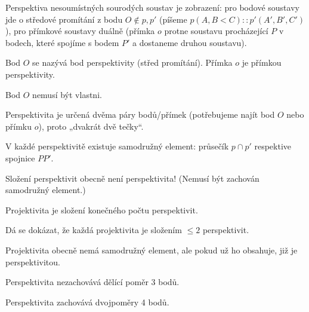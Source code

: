 \documentclass[12pt]{article}					%
\begin{document}
\begin{definice}[Perspektiva]
	Perspektiva nesoumístných sourodých soustav je zobrazení: pro bodové soustavy jde o středové promítání z bodu $O \notin p, p'$ (píšeme $p(A, B< C)::p'(A', B', C')$), pro přímkové soustavy duálně (přímka $o$ protne soustavu procházející $P$ v bodech, které spojíme s bodem $P'$ a dostaneme druhou soustavu).

	Bod $O$ se nazývá bod perspektivity (střed promítání). Přímka $o$ je přímkou perspektivity.

	\begin{poznamkain}
		Bod $O$ nemusí být vlastni.
	\end{poznamkain}

	\begin{poznamkain}[Značení $::$]
		Perspektivita je určená dvěma páry bodů/přímek (potřebujeme najít bod $O$ nebo přímku $o$), proto „dvakrát dvě tečky“.
	\end{poznamkain}
\end{definice}

\begin{dusledek}
	V každé perspektivitě existuje samodružný element: průsečík $p \cap p'$ respektive spojnice $P P'$.
\end{dusledek}

\begin{upozorneni}
	Složení perspektivit obecně není perspektivita! (Nemusí být zachován samodružný element.)
\end{upozorneni}

\begin{definice}[Projektivita]
	Projektivita je složení konečného počtu perspektivit.

	\begin{poznamkain}
		Dá se dokázat, že každá projektivita je složením $≤ 2$ perspektivit.
	\end{poznamkain}
\end{definice}

\begin{dusledek}
	Projektivita obecně nemá samodružný element, ale pokud už ho obsahuje, již je perspektivitou.
\end{dusledek}

\begin{upozorneni}
	Perspektivita nezachovává dělící poměr 3 bodů.
\end{upozorneni}

\begin{tvrzeni}
	Perspektivita zachovává dvojpoměry 4 bodů.
\end{tvrzeni}
\end{document}
